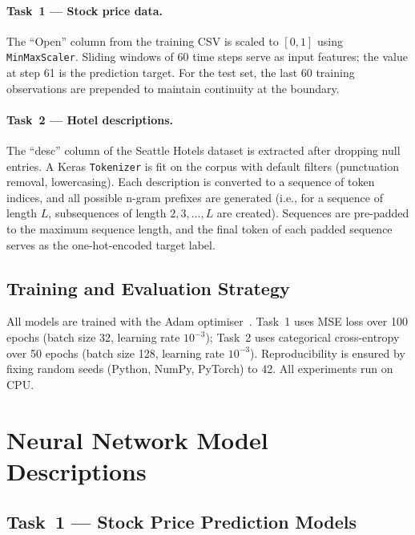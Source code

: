 \documentclass[11pt,letterpaper]{article}
\begin{document}
\paragraph{Task~1 --- Stock price data.}
The ``Open'' column from the training CSV is scaled to $[0,1]$ using
\texttt{MinMaxScaler}.
Sliding windows of 60 time steps serve as input features; the value at step 61 is
the prediction target.
For the test set, the last 60 training observations are prepended to maintain
continuity at the boundary.

\paragraph{Task~2 --- Hotel descriptions.}
The ``desc'' column of the Seattle Hotels dataset is extracted after dropping null
entries.
A Keras \texttt{Tokenizer} is fit on the corpus with default filters (punctuation
removal, lowercasing).
Each description is converted to a sequence of token indices, and all possible
n-gram prefixes are generated (i.e., for a sequence of length $L$, subsequences
of length $2, 3, \ldots, L$ are created).
Sequences are pre-padded to the maximum sequence length, and the final token of
each padded sequence serves as the one-hot-encoded target label.

\subsection{Training and Evaluation Strategy}

All models are trained with the Adam optimiser~\cite{kingma2015adam}.
Task~1 uses MSE loss over 100 epochs (batch size 32, learning rate $10^{-3}$);
Task~2 uses categorical cross-entropy over 50 epochs (batch size 128, learning rate
$10^{-3}$).
Reproducibility is ensured by fixing random seeds (Python, NumPy, PyTorch) to 42.
All experiments run on CPU.

\section{Neural Network Model Descriptions}

\subsection{Task~1 --- Stock Price Prediction Models}
\end{document}
